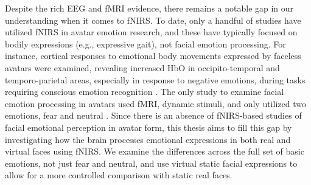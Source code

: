 Despite the rich EEG and fMRI evidence, there remains a notable gap in our understanding when it comes to fNIRS. 
To date, only a handful of studies have utilized fNIRS in avatar emotion research, and these have typically focused on bodily expressions (e.g., expressive gait), not facial emotion processing. 
For instance, cortical responses to emotional body movements expressed by faceless avatars were examined, revealing increased HbO in occipito-temporal and temporo-parietal areas, especially in response to negative emotions, during tasks requiring conscious emotion recognition \citep{schneider_show_2014}. 
The only study to examine facial emotion processing in avatars used fMRI, dynamic stimuli, and only utilized two emotions, fear and neutral \citep{kegel_dynamic_2020}. 
Since there is an absence of fNIRS-based studies of facial emotional perception in avatar form, this thesis aims to fill this gap by investigating how the brain processes emotional expressions in both real and virtual faces using fNIRS.
We examine the differences across the full set of basic emotions, not just fear and neutral, and use virtual static facial expressions to allow for a more controlled comparison with static real faces.

